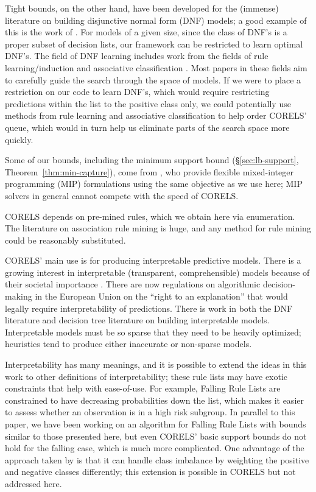 \documentclass[twoside,11pt]{article}
\def\eg{{\it e.g.},~}
\begin{document}
Tight bounds, on the other hand, have been developed for the (immense) literature on building disjunctive normal form (DNF) models; a good example of this is the work of \citet{Rijnbeek10}.
%
For models of a given size, since the class of DNF's is a proper subset of decision lists, our framework can be restricted to learn optimal DNF's.
The field of DNF learning includes work from the fields of rule learning/induction \citep[\eg early algorithms by][]{Michalski1969,ClarkNiblett1989,Frank1998} and associative classification \citep{Vanhoof10}.
Most papers in these fields aim to carefully guide the search through the space of models. If we were to place a restriction on our code to learn DNF's, which would require restricting predictions within the list to the positive class only, we could potentially use methods from rule learning and associative classification to help order CORELS' queue, which would in turn help us eliminate parts of the search space more quickly.

Some of our bounds, including the minimum support bound
(\S\ref{sec:lb-support}, Theorem~\ref{thm:min-capture}),
come from \citet{RudinEr16}, who provide flexible mixed-integer programming (MIP)
formulations using the same objective as we use here;
MIP solvers in general cannot compete with the speed of CORELS.

CORELS depends on pre-mined rules, which we obtain here via enumeration.
The literature on association rule mining is huge, and any method for rule mining could be reasonably substituted.

CORELS' main use is for producing interpretable predictive models. There is a growing interest in interpretable (transparent, comprehensible) models because of their societal importance \citep[see][]{ruping2006learning,bratko1997machine,dawes1979robust,VellidoEtAl12,Giraud98,Holte93,Schmueli10,Huysmans11,Freitas14}. There are now regulations on algorithmic decision-making in the European Union on the ``right to an explanation'' \citep{Goodman2016EU} that would legally require interpretability of predictions. There is work in both the DNF literature \citep{Ruckert2008} and decision tree literature \citep{GarofalakisHyRaSh00} on building interpretable models. Interpretable models must be so sparse that they need to be heavily optimized; heuristics tend to produce either inaccurate or non-sparse models.

Interpretability has many meanings, and it is possible to extend the ideas in this work to other definitions of interpretability; these rule lists may have exotic constraints that help with ease-of-use. For example, Falling Rule Lists \citep{WangRu15} are constrained to have decreasing probabilities down the list, which makes it easier to assess whether an observation is in a high risk subgroup. In parallel to this paper, we have been working on an algorithm for Falling Rule Lists \citep{ChenRu18} with bounds similar to those presented here, but even CORELS' basic support bounds do not hold for the falling case, which is much more complicated. One advantage of the approach taken by \citet{ChenRu18} is that it can handle class imbalance by weighting the positive and negative classes differently; this extension is possible in CORELS but not addressed here.
\end{document}
